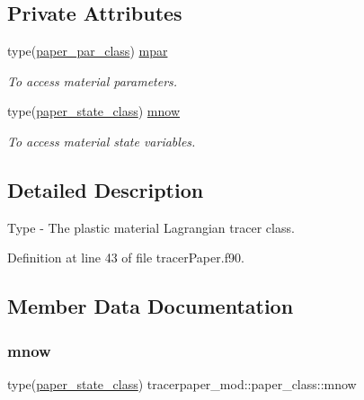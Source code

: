 \subsection*{Private Attributes}
\begin{DoxyCompactItemize}
\item 
type(\mbox{\hyperlink{structtracerpaper__mod_1_1paper__par__class}{paper\+\_\+par\+\_\+class}}) \mbox{\hyperlink{structtracerpaper__mod_1_1paper__class_a26cdff9536d77341f4c2d815400a7a86}{mpar}}
\begin{DoxyCompactList}\small\item\em To access material parameters. \end{DoxyCompactList}\item 
type(\mbox{\hyperlink{structtracerpaper__mod_1_1paper__state__class}{paper\+\_\+state\+\_\+class}}) \mbox{\hyperlink{structtracerpaper__mod_1_1paper__class_a737a7e41a12ed99f6d3deaddc0a07554}{mnow}}
\begin{DoxyCompactList}\small\item\em To access material state variables. \end{DoxyCompactList}\end{DoxyCompactItemize}


\subsection{Detailed Description}
Type -\/ The plastic material Lagrangian tracer class. 

Definition at line 43 of file tracer\+Paper.\+f90.



\subsection{Member Data Documentation}
\mbox{\label{structtracerpaper__mod_1_1paper__class_a737a7e41a12ed99f6d3deaddc0a07554}} 
\subsubsection{\texorpdfstring{mnow}{mnow}}
{\footnotesize\ttfamily type(\mbox{\hyperlink{structtracerpaper__mod_1_1paper__state__class}{paper\+\_\+state\+\_\+class}}) tracerpaper\+\_\+mod\+::paper\+\_\+class\+::mnow\hspace{0.3cm}{\ttfamily [private]}}



